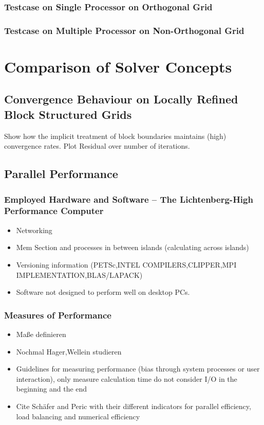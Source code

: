 \documentclass[article,type=msc,colorback,accentcolor=tud2a]{tudthesis}
\begin{document}
      \subsubsection{Testcase on Single Processor on Orthogonal Grid}
      \subsubsection{Testcase on Multiple Processor on Non-Orthogonal Grid}

  \section{Comparison of Solver Concepts}
  
    \subsection{Convergence Behaviour on Locally Refined Block Structured Grids}

      Show how the implicit treatment of block boundaries maintains (high) convergence rates. Plot Residual over number of iterations.

    \subsection{Parallel Performance}
      \subsubsection{Employed Hardware and Software -- The Lichtenberg-High Performance Computer }
        \begin{itemize}
          \item Networking
          \item Mem Section and processes in between islands (calculating across islands)
          \item Versioning information (PETSc,INTEL COMPILERS,CLIPPER,MPI IMPLEMENTATION,BLAS/LAPACK)
          \item Software not designed to perform well on desktop PCs.
        \end{itemize}

      \subsubsection{Measures of Performance}
        \begin{itemize}
          \item Maße definieren
          \item Nochmal Hager,Wellein studieren
          \item Guidelines for measuring performance (bias through system processes or user interaction), only measure calculation time do not consider I/O in the beginning and the end
          \item Cite Schäfer and Peric with their different indicators for parallel efficiency, load balancing and numerical efficiency
        \end{itemize}
\end{document}
